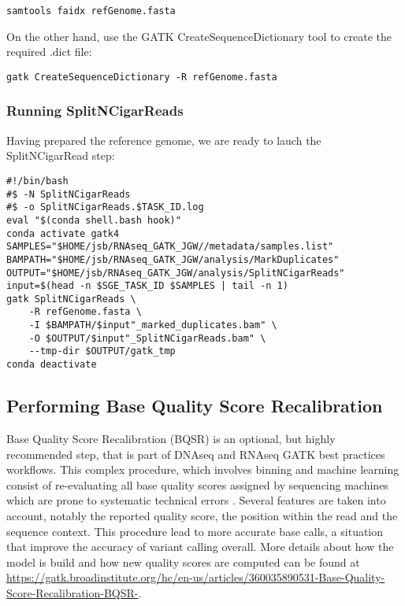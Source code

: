 \begin{verbatim}
samtools faidx refGenome.fasta
\end{verbatim}

On the other hand, use the GATK CreateSequenceDictionary tool to create the required .dict file:

\begin{verbatim}
gatk CreateSequenceDictionary -R refGenome.fasta
\end{verbatim}




\subsubsection{Running SplitNCigarReads}

Having prepared the reference genome, we are ready to lauch the SplitNCigarRead step:

\begin{verbatim}
#!/bin/bash
#$ -N SplitNCigarReads
#$ -o SplitNCigarReads.$TASK_ID.log
eval "$(conda shell.bash hook)"
conda activate gatk4
SAMPLES="$HOME/jsb/RNAseq_GATK_JGW//metadata/samples.list"
BAMPATH="$HOME/jsb/RNAseq_GATK_JGW/analysis/MarkDuplicates"
OUTPUT="$HOME/jsb/RNAseq_GATK_JGW/analysis/SplitNCigarReads"
input=$(head -n $SGE_TASK_ID $SAMPLES | tail -n 1)
gatk SplitNCigarReads \
	-R refGenome.fasta \
	-I $BAMPATH/$input"_marked_duplicates.bam" \
	-O $OUTPUT/$input"_SplitNCigarReads.bam" \
	--tmp-dir $OUTPUT/gatk_tmp
conda deactivate
\end{verbatim}



\subsection{Performing Base Quality Score Recalibration}

Base Quality Score Recalibration (BQSR) is an optional, but highly recommended step, that is part of DNAseq and RNAseq GATK best practices workflows. This complex procedure, which involves binning and machine learning consist of re-evaluating all base quality scores assigned by sequencing machines which are prone to systematic technical errors \cite{GATK_BaseQuality}. Several features are taken into account, notably the reported quality score, the position within the read and the sequence context. This procedure lead to more accurate base calls, a situation that improve the accuracy of variant calling overall. More details about how the model is build and how new quality scores are computed can be found at \href{https://gatk.broadinstitute.org/hc/en-us/articles/360035890531-Base-Quality-Score-Recalibration-BQSR-}{https://gatk.broadinstitute.org/hc/en-us/articles/360035890531-Base-Quality-Score-Recalibration-BQSR-}.

